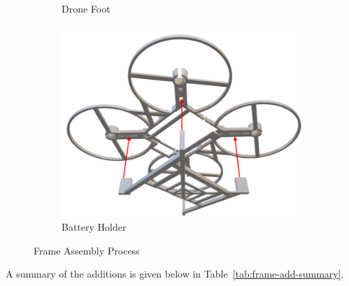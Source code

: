 \begin{figure}[H]
\begin{subfigure}[b]{0.35\textwidth}
        \caption{Drone Foot}
    \end{subfigure}
    \begin{subfigure}[b]{0.35\textwidth}
        \centering
        \includegraphics[width=\textwidth]{img/assembly-8.png}
        \caption{Battery Holder}
    \end{subfigure}
    \caption{Frame Assembly Process}
\end{figure}

A summary of the additions is given below in Table~\ref{tab:frame-add-summary}.

